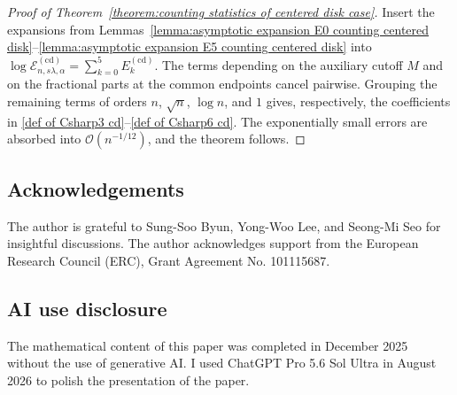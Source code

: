 \documentclass[a4paper]{article}
\numberwithin{equation}{section}
\begin{document}
\begin{proof}[Proof of Theorem~\ref{theorem:counting statistics of centered disk case}]
Insert the expansions from
Lemmas~\ref{lemma:asymptotic expansion E0 counting centered disk}--\ref{lemma:asymptotic expansion E5 counting centered disk}
into $\log\mathcal E_{n,s\lambda,\alpha}^{(\mathrm{cd})}
=\sum_{k=0}^{5}E_k^{(\mathrm{cd})}$.  The terms depending on the auxiliary
cutoff $M$ and on the fractional parts at the common endpoints cancel
pairwise.  Grouping the remaining terms of orders $n$, $\sqrt n$, $\log n$,
and $1$ gives, respectively, the coefficients in
\eqref{def of Csharp3 cd}--\eqref{def of Csharp6 cd}.  The exponentially small
errors are absorbed into $\mathcal{O}(n^{-1/12})$, and the theorem follows.
\end{proof}


\subsection*{Acknowledgements}
The author is grateful to Sung-Soo Byun, Yong-Woo Lee, and Seong-Mi Seo for insightful discussions.
The author acknowledges support from the European Research Council (ERC), Grant Agreement No. 101115687. 


\subsection*{AI use disclosure}
The mathematical content of this paper was completed in December 2025 without the use of generative AI. I used ChatGPT Pro 5.6 Sol Ultra in August 2026 to polish the presentation of the paper.
\end{document}
